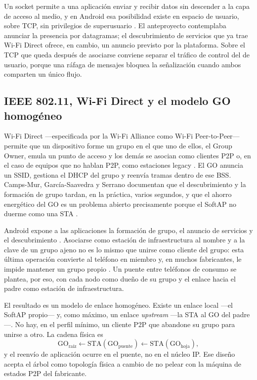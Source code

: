\documentclass[12pt,oneside]{scrreprt}
\begin{document}
Un socket permite a una aplicación enviar y recibir datos sin descender a la capa de acceso al medio, y en Android esa posibilidad existe en espacio de usuario, sobre TCP, sin privilegios de superusuario \parencite{AndroidDevelopers2024}. El anteproyecto contemplaba anunciar la presencia por datagramas; el descubrimiento de servicios que ya trae Wi-Fi Direct ofrece, en cambio, un anuncio previsto por la plataforma. Sobre el TCP que queda después de asociarse conviene separar el tráfico de control del de usuario, porque una ráfaga de mensajes bloquea la señalización cuando ambos comparten un único flujo.

\subsection{IEEE 802.11, Wi-Fi Direct y el modelo GO homogéneo}
\label{sec:wifi-direct}

Wi-Fi Direct ---especificada por la Wi-Fi Alliance como Wi-Fi Peer-to-Peer--- permite que un dispositivo forme un grupo en el que uno de ellos, el Group Owner, emula un punto de acceso y los demás se asocian como clientes P2P o, en el caso de equipos que no hablan P2P, como estaciones legacy \parencite{WiFiAlliance2010,CampsMur2013}. El GO anuncia un SSID, gestiona el DHCP del grupo y reenvía tramas dentro de ese BSS. Camps-Mur, García-Saavedra y Serrano documentan que el descubrimiento y la formación de grupo tardan, en la práctica, varios segundos, y que el ahorro energético del GO es un problema abierto precisamente porque el SoftAP no duerme como una STA \parencite{CampsMur2013}.

Android expone a las aplicaciones la formación de grupo, el anuncio de servicios y el descubrimiento \parencite{AndroidDevelopersWifiP2p}. Asociarse como estación de infraestructura al nombre y a la clave de un grupo ajeno no es lo mismo que unirse como cliente del grupo: esta última operación convierte al teléfono en miembro y, en muchos fabricantes, le impide mantener un grupo propio \parencite{AndroidDevelopersWifiNetworkSpecifier}. Un puente entre teléfonos de consumo se plantea, por eso, con cada nodo como dueño de su grupo y el enlace hacia el padre como estación de infraestructura.

El resultado es un modelo de enlace homogéneo. Existe un enlace local ---el SoftAP propio--- y, como máximo, un enlace \emph{upstream} ---la STA al GO del padre---. No hay, en el perfil mínimo, un cliente P2P que abandone su grupo para unirse a otro. La cadena física es
\[
\mathrm{GO}_{\text{raíz}} \leftarrow \mathrm{STA}(\mathrm{GO}_{\text{puente}}) \leftarrow \mathrm{STA}(\mathrm{GO}_{\text{hoja}}),
\]
y el reenvío de aplicación ocurre en el puente, no en el núcleo IP. Ese diseño acepta el árbol como topología física a cambio de no pelear con la máquina de estados P2P del fabricante.
\end{document}

